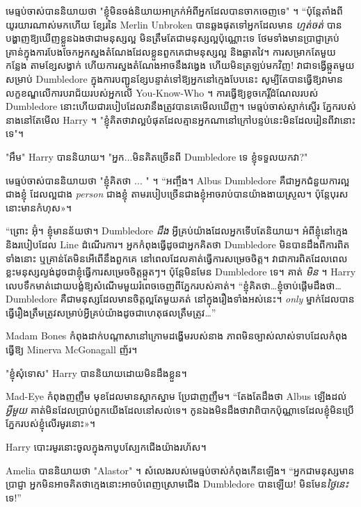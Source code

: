 មេធ្មប់ចាស់បាននិយាយថា "ខ្ញុំមិនចង់និយាយអាក្រក់អំពីអ្នកដែលបានចាកចេញទេ" ។ “ប៉ុន្តែតាំងពីយូរយារណាស់មកហើយ ខ្សែរនៃ Merlin Unbroken បានឆ្លងផុតទៅអ្នកដែលមាន \emph{ហ្មត់ចត់} បានបង្ហាញឱ្យឃើញខ្លួនឯងថាជាមនុស្សល្អ មិនត្រឹមតែជាមនុស្សល្អប៉ុណ្ណោះទេ ថែមទាំងមានប្រាជ្ញាគ្រប់គ្រាន់ក្នុងការបែងចែកអ្នកស្នងតំណែងដែលខ្លួនពួកគេជាមនុស្សល្អ និងឆ្លាតវៃ។ ការសម្រាកតែមួយកន្លែង តាមខ្សែសង្វាក់ ហើយការស្នងតំណែងអាចនឹងវង្វេង ហើយមិនត្រឡប់មកវិញ! វា​ជា​ទង្វើ​ឆ្កួត​មួយ​សម្រាប់ Dumbledore ក្នុង​ការ​បញ្ជូន​ខ្សែបន្ទាត់​ទៅ​ឱ្យ​អ្នក​នៅ​ក្មេង​បែប​នេះ សូម្បី​តែ​បាន​ធ្វើ​ឱ្យ​វា​មាន​លក្ខខណ្ឌ​លើ​ការ​បរាជ័យ​របស់​អ្នក​លើ You-Know-Who ។ ការធ្វើឱ្យខូចកេរ្តិ៍ដំណែលរបស់ Dumbledore នោះហើយជារបៀបដែលវានឹងត្រូវបានគេមើលឃើញ។ មេធ្មប់ចាស់ស្ទាក់ស្ទើរ ភ្នែករបស់នាងនៅតែមើល Harry ។ "ខ្ញុំ​គិត​ថា​វា​ល្អ​បំផុត​ដែល​គ្មាន​អ្នក​ណា​នៅ​ក្រៅ​បន្ទប់​នេះ​មិន​ដែល​រៀន​ពី​វា​នោះ​ទេ"។

"អឹម" Harry បាននិយាយ។ "អ្នក...មិនគិតច្រើនពី Dumbledore ទេ ខ្ញុំទទួលយកវា?"

មេធ្មប់ចាស់បាននិយាយថា "ខ្ញុំគិតថា ... " ។ “អញ្ចឹង។ Albus Dumbledore គឺជាអ្នកជំនួយការល្អជាងខ្ញុំ ដែលល្អជាង \emph{person} ជាងខ្ញុំ តាមរបៀបច្រើនជាងខ្ញុំអាចរាប់បានយ៉ាងងាយស្រួល។ ប៉ុន្តែ​បុរស​នោះ​មាន​កំហុស»។

“ព្រោះ អ៊ុំ។ ខ្ញុំមានន័យថា។ Dumbledore \emph{ដឹង} អ្វីគ្រប់យ៉ាងដែលអ្នកទើបតែនិយាយ។ អំពីខ្ញុំនៅក្មេង និងរបៀបដែល Line ដំណើរការ។ អ្នក​កំពុង​ធ្វើ​ដូច​ជា​អ្នក​គិត​ថា Dumbledore មិន​បាន​ដឹង​ពី​ការ​ពិត​ទាំង​នោះ ឬ​គ្រាន់​តែ​មិន​អើពើ​នឹង​ពួក​គេ នៅ​ពេល​ដែល​គាត់​ធ្វើ​ការ​សម្រេច​ចិត្ត។ វាជាការពិតដែលពេលខ្លះមនុស្សល្ងង់ដូចជាខ្ញុំធ្វើការសម្រេចចិត្តឆ្កួតៗ។ ប៉ុន្តែមិនមែន Dumbledore ទេ។ គាត់ \emph{មិន } ។ Harry លេបទឹកមាត់ដោយបង្ខំឱ្យសំណើមមួយរំពេចចេញពីភ្នែករបស់គាត់។ “ខ្ញុំគិតថា…ខ្ញុំចាប់ផ្តើមដឹងថា… Dumbledore គឺជាមនុស្សដែលមានចិត្តល្អតែមួយគត់ នៅក្នុងរឿងទាំងអស់នេះ។ \emph{only} ម្នាក់ដែលបានធ្វើរឿងត្រឹមត្រូវសម្រាប់អ្វីគ្រប់យ៉ាងដូចជាហេតុផលត្រឹមត្រូវ…”

Madam Bones កំពុងដាក់បណ្តាសានៅក្រោមដង្ហើមរបស់នាង ភាពមិនច្បាស់លាស់ទាបដែលកំពុងធ្វើឱ្យ Minerva McGonagall ញ័រ។

"ខ្ញុំសុំទោស" Harry បាននិយាយដោយមិនដឹងខ្លួន។

Mad-Eye កំពុងញញឹម មុខដែលមានស្លាកស្នាម ប្រែជាញញឹម។ “តែងតែដឹងថា Albus ឡើងដល់\emph{អ្វីមួយ} គាត់មិនដែលប្រាប់ពួកយើងដែលនៅសល់ទេ។ កូន​ឯង​មិន​ដឹង​ថា​វា​ពិបាក​ប៉ុណ្ណា​ទេ​ដែល​ខ្ញុំ​មិន​ប្រើ​ភ្នែក​របស់​ខ្ញុំ​លើ​រមូរ​នោះ»។

Harry បោះ​រមូរ​នោះ​ចូល​ក្នុង​កាបូប​ស្បែក​ជើង​យ៉ាង​រហ័ស។

Amelia បាននិយាយថា "Alastor" ។ សំលេងរបស់មេធ្មប់ចាស់កំពុងកើនឡើង។ “អ្នក​ជា​មនុស្ស​មាន​ប្រាជ្ញា អ្នក​មិន​អាច​គិត​ថា​ក្មេង​នោះ​អាច​បំពេញ​ស្រោមជើង Dumbledore បាន​ឡើយ! មិនមែន\emph{ថ្ងៃនេះ}ទេ!”

